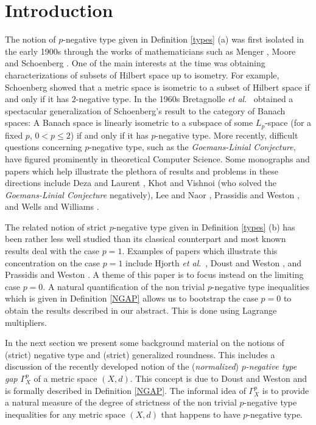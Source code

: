 \documentclass[10pt]{amsart}
\theoremstyle{definition}
\theoremstyle{remark}
\begin{document}
\section{Introduction}
The notion of $p$-negative type given in Definition \ref{types} (a) was first isolated in the early
1900s through the works of mathematicians such as
Menger \cite{M}, Moore \cite{MOO} and Schoenberg \cite{S1, S2}. One of
the main interests at the time was obtaining characterizations of subsets of Hilbert space up to isometry.
For example, Schoenberg showed that a metric space is isometric to a subset of Hilbert
space if and only if it has $2$-negative type. In the 1960s Bretagnolle \textit{et al}.\ \cite{BDK}
obtained a spectacular generalization of Schoenberg's result to the
category of Banach spaces: A Banach space is linearly isometric to a subspace of some
$L_{p}$-space (for a fixed $p$, $0 < p \leq 2$) if and only if it has $p$-negative type. More recently,
difficult questions concerning $p$-negative type, such as the \textit{Goemans-Linial
Conjecture}, have figured prominently in theoretical Computer Science.
Some monographs and papers which help illustrate the plethora of results and problems in these directions include
Deza and Laurent \cite{DL}, Khot and Vishnoi \cite{KV} (who solved the
\textit{Goemans-Linial Conjecture} negatively), Lee and Naor \cite{LN}, Prassidis and Weston \cite{PW},
and Wells and Williams \cite{WW}.

The related notion of strict $p$-negative type given in Definition \ref{types} (b)
has been rather less well studied than its classical counterpart and most known results deal with the
case $p=1$. Examples of papers which illustrate this concentration on the case $p=1$ include Hjorth
\textit{et al}.\ \cite{HKM, HLM}, Doust and Weston \cite{DW, DW2}, and Prassidis and Weston \cite{PW}.
A theme of this paper is to focus instead on the limiting case $p=0$.
A natural quantification of
the non trivial $p$-negative type inequalities which is given in Definition \ref{NGAP} allows us to
bootstrap the case $p=0$ to obtain the results described in our abstract. This is done
using 
Lagrange multipliers.

In the next section we present some background material
on the notions of (strict) negative type and (strict) generalized roundness. This includes a discussion
of the recently developed notion of the (\textit{normalized}) \textit{$p$-negative type gap}
$\Gamma_{X}^{p}$ of a metric space $(X,d)$. This concept is due to Doust and Weston \cite{DW} and is
formally described in Definition \ref{NGAP}. The informal idea of $\Gamma_{X}^{p}$ is to provide a
natural measure of the degree of strictness of the non trivial $p$-negative type inequalities for any
metric space $(X,d)$ that happens to have $p$-negative type.
\end{document}

